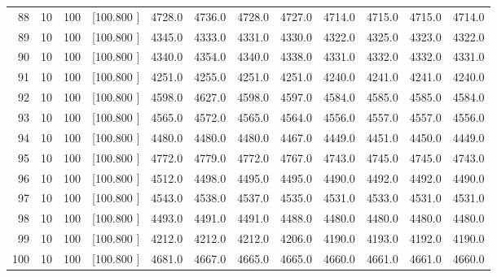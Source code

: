 \documentclass[12pt,a4paper]{article}
\begin{document}
\begin{center}
{\begin{tabular}{r r r r r r r r r r r r}
  88& 10&100&[100.800   ]&  4728.0&  4736.0&  4728.0&  4727.0&  4714.0&  4715.0&  4715.0&  4714.0\\[-0.02in]
  89& 10&100&[100.800   ]&  4345.0&  4333.0&  4331.0&  4330.0&  4322.0&  4325.0&  4323.0&  4322.0\\[-0.02in]
  90& 10&100&[100.800   ]&  4340.0&  4354.0&  4340.0&  4338.0&  4331.0&  4332.0&  4332.0&  4331.0\\[-0.02in]
  91& 10&100&[100.800   ]&  4251.0&  4255.0&  4251.0&  4251.0&  4240.0&  4241.0&  4241.0&  4240.0\\[-0.02in]
  92& 10&100&[100.800   ]&  4598.0&  4627.0&  4598.0&  4597.0&  4584.0&  4585.0&  4585.0&  4584.0\\[-0.02in]
  93& 10&100&[100.800   ]&  4565.0&  4572.0&  4565.0&  4564.0&  4556.0&  4557.0&  4557.0&  4556.0\\[-0.02in]
  94& 10&100&[100.800   ]&  4480.0&  4480.0&  4480.0&  4467.0&  4449.0&  4451.0&  4450.0&  4449.0\\[-0.02in]
  95& 10&100&[100.800   ]&  4772.0&  4779.0&  4772.0&  4767.0&  4743.0&  4745.0&  4745.0&  4743.0\\[-0.02in]
  96& 10&100&[100.800   ]&  4512.0&  4498.0&  4495.0&  4495.0&  4490.0&  4492.0&  4492.0&  4490.0\\[-0.02in]
  97& 10&100&[100.800   ]&  4543.0&  4538.0&  4537.0&  4535.0&  4531.0&  4533.0&  4531.0&  4531.0\\[-0.02in]
  98& 10&100&[100.800   ]&  4493.0&  4491.0&  4491.0&  4488.0&  4480.0&  4480.0&  4480.0&  4480.0\\[-0.02in]
  99& 10&100&[100.800   ]&  4212.0&  4212.0&  4212.0&  4206.0&  4190.0&  4193.0&  4192.0&  4190.0\\[-0.02in]
 100& 10&100&[100.800   ]&  4681.0&  4667.0&  4665.0&  4665.0&  4660.0&  4661.0&  4661.0&  4660.0\\[-0.02in]

\hline
\end{tabular}}
\end{center}
\end{document}
